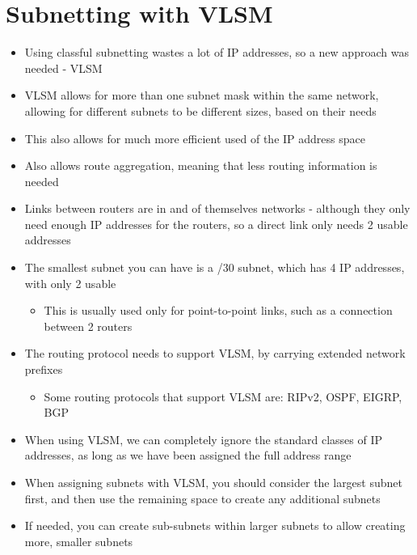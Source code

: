 
\section*{Subnetting with VLSM}

\begin{itemize}
  \item Using classful subnetting wastes a lot of IP addresses, so a new approach was needed - VLSM
  \item VLSM allows for more than one subnet mask within the same network, allowing for different subnets to be different sizes, based on their needs
  \item This also allows for much more efficient used of the IP address space
  \item Also allows route aggregation, meaning that less routing information is needed
  \item Links between routers are in and of themselves networks - although they only need enough IP addresses for the routers, so a direct link only needs 2 usable addresses
  \item The smallest subnet you can have is a /30 subnet, which has 4 IP addresses, with only 2 usable
  \begin{itemize}
    \item This is usually used only for point-to-point links, such as a connection between 2 routers
  \end{itemize}
\end{itemize}

\begin{itemize}
  \item The routing protocol needs to support VLSM, by carrying extended network prefixes
  \begin{itemize}
    \item Some routing protocols that support VLSM are: RIPv2, OSPF, EIGRP, BGP
  \end{itemize}
  \item When using VLSM, we can completely ignore the standard classes of IP addresses, as long as we have been assigned the full address range
  \item When assigning subnets with VLSM, you should consider the largest subnet first, and then use the remaining space to create any additional subnets
  \item If needed, you can create sub-subnets within larger subnets to allow creating more, smaller subnets
\end{itemize}

